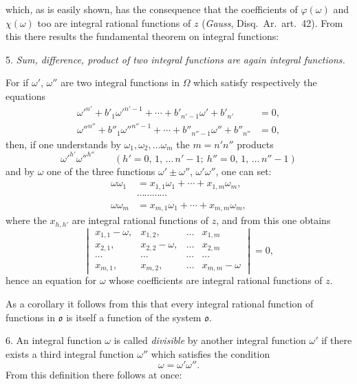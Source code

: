 \documentclass{article}
\begin{document}
which, as is easily shown, has the consequence that the coefficients of $\varphi(\omega)$ and $\chi(\omega)$ too are integral rational functions of $z$ (\emph{Gauss}, Disq.\ Ar.\ art.~42). From this there results the fundamental theorem on integral functions:

5. \emph{Sum, difference, product of two integral functions are again integral functions.}

For if $\omega'$, $\omega''$ are two integral functions in $\Omega$ which satisfy respectively the equations
\[ \begin{aligned} \omega'^{n'} + b'_{1}\omega'^{n'-1} + \cdots + b'_{n'-1}\omega' + b'_{n'} &= 0, \\ \omega''^{n''} + b''_{1}\omega''^{n''-1} + \cdots + b''_{n''-1}\omega'' + b''_{n''} &= 0, \end{aligned} \]
then, if one understands by $\omega_{1}, \omega_{2}, \ldots \omega_{m}$ the $m = n'n''$ products
\[ \omega'^{h'}\omega''^{h''} \qquad {\scriptstyle (h' = 0,\, 1,\, \ldots\, n'-1;\ h'' = 0,\, 1,\, \ldots\, n''-1)} \]
and by $\omega$ one of the three functions $\omega' \pm \omega''$, $\omega'\omega''$, one can set:
\[ \begin{aligned} \omega\omega_{1} &= x_{1,1}\omega_{1} + \cdots + x_{1,m}\omega_{m}, \\ &\cdots\cdots\cdots\cdots \\ \omega\omega_{m} &= x_{m,1}\omega_{1} + \cdots + x_{m,m}\omega_{m}, \end{aligned} \]
where the $x_{h,h'}$ are integral rational functions of $z$, and from this one obtains
\[ \begin{vmatrix} x_{1,1}-\omega, & x_{1,2}, & \ldots & x_{1,m} \\ x_{2,1}, & x_{2,2}-\omega, & \ldots & x_{2,m} \\ \cdots & \cdots & \cdots & \cdots \\ x_{m,1}, & x_{m,2}, & \ldots & x_{m,m}-\omega \end{vmatrix} = 0, \]
hence an equation for $\omega$ whose coefficients are integral rational functions of $z$.

As a corollary it follows from this that every integral rational function of functions in $\mathfrak{o}$ is itself a function of the system $\mathfrak{o}$.

6. An integral function $\omega$ is called \emph{divisible} by another integral function $\omega'$ if there exists a third integral function $\omega''$ which satisfies the condition
\[ \omega = \omega'\omega''. \]
From this definition there follows at once:
\end{document}
